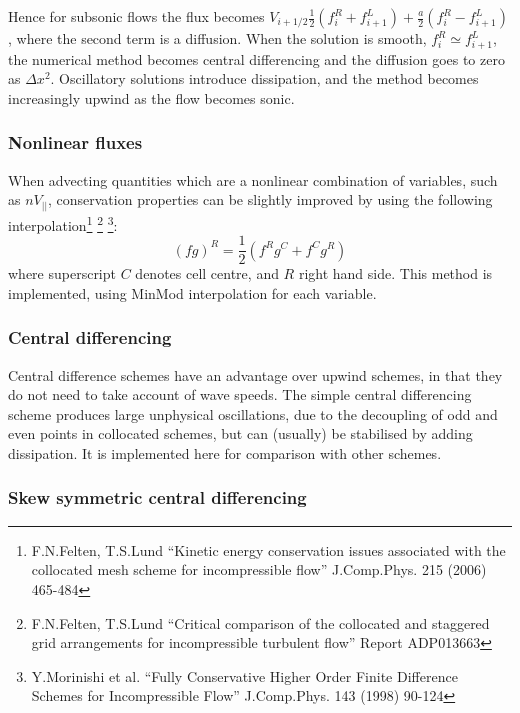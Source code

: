 \documentclass[12pt,a4paper]{article}
\begin{document}
Hence for subsonic flows the flux becomes $V_{i+1/2}\frac{1}{2}\left(f^R_i + f^L_{i+1}\right) + \frac{a}{2}\left(f^R_i - f^L_{i+1}\right)$, where the second term is a diffusion. When the solution is smooth, $f^R_{i}\simeq f^L_{i+1}$, the numerical method becomes central differencing and the diffusion goes to zero as $\Delta x^2$. Oscillatory solutions introduce dissipation, and the method becomes increasingly upwind as the flow becomes sonic.

\subsubsection{Nonlinear fluxes}
\label{sec:nonlinflux}

When advecting quantities which are a nonlinear combination of variables, such as $nV_{||}$, 
conservation properties can be slightly improved by using the following interpolation\footnote{F.N.Felten, T.S.Lund ``Kinetic energy conservation issues associated with the collocated mesh scheme for incompressible flow'' J.Comp.Phys. 215 (2006) 465-484}
\footnote{F.N.Felten, T.S.Lund ``Critical comparison of the collocated and staggered grid arrangements for incompressible turbulent flow'' Report ADP013663}
\footnote{Y.Morinishi et al. ``Fully Conservative Higher Order Finite Difference Schemes for Incompressible Flow'' J.Comp.Phys. 143 (1998) 90-124}:
\begin{equation}
\left(fg\right)^R = \frac{1}{2}\left(f^Rg^C + f^Cg^R\right)
\end{equation}
where superscript $C$ denotes cell centre, and $R$ right hand side. This method is implemented, using
MinMod interpolation for each variable.

\subsubsection{Central differencing}
\label{sec:central}

Central difference schemes have an advantage over upwind schemes, in that they do not need to take account
of wave speeds. The simple central differencing scheme produces large unphysical oscillations, due to the
decoupling of odd and even points in collocated schemes, but can (usually) be stabilised by adding dissipation. 
It is implemented here for comparison with other schemes.


\subsubsection{Skew symmetric central differencing}
\label{sec:skewform}
\end{document}
